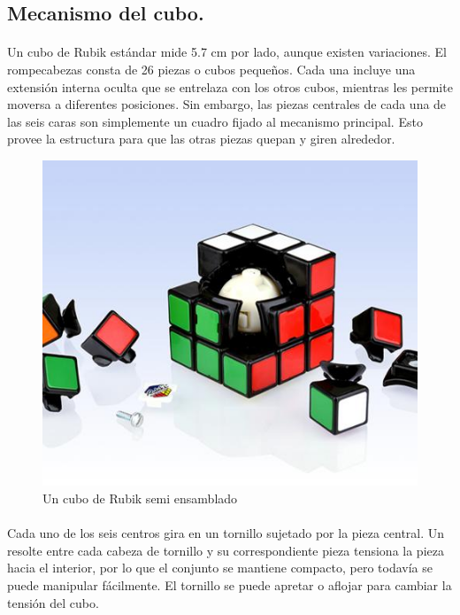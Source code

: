 \documentclass[12pt, letterpaper]{article}
\begin{document}
\subsection{Mecanismo del cubo.}
\paragraph{}
Un cubo de Rubik estándar mide 5.7 cm por lado, aunque existen variaciones. El rompecabezas consta de 26 piezas o cubos pequeños. Cada una incluye una extensión interna oculta que se entrelaza con los otros cubos, mientras les permite moversa a diferentes posiciones. Sin embargo, las piezas centrales de cada una de las seis caras son simplemente un cuadro fijado al mecanismo principal. Esto provee la estructura para que las otras piezas quepan y giren alrededor.
\begin{figure}[hb]
	\centering
	\includegraphics[scale=0.4]{images/mechanism.jpg}
	\caption{Un cubo de Rubik semi ensamblado}
	\label{fig:mechanism}
\end{figure}
\paragraph{}
Cada uno de los seis centros gira en un tornillo sujetado por la pieza central. Un resolte entre cada cabeza de tornillo y su correspondiente pieza tensiona la pieza hacia el interior, por lo que el conjunto se mantiene compacto, pero todavía se puede manipular fácilmente. El tornillo se puede apretar o aflojar para cambiar la tensión del cubo. 
\end{document}
